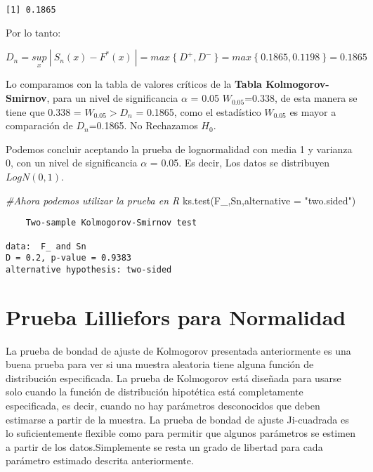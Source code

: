 \documentclass[
  a4paper,
  oneside,
  openany]{book}
\newenvironment{Shaded}{\begin{snugshade}}{\end{snugshade}}
\newcommand{\AttributeTok}[1]{\textcolor[rgb]{0.77,0.63,0.00}{#1}}
\newcommand{\CommentTok}[1]{\textcolor[rgb]{0.56,0.35,0.01}{\textit{#1}}}
\newcommand{\FunctionTok}[1]{\textcolor[rgb]{0.00,0.00,0.00}{#1}}
\newcommand{\NormalTok}[1]{#1}
\newcommand{\StringTok}[1]{\textcolor[rgb]{0.31,0.60,0.02}{#1}}
\begin{document}
\begin{verbatim}
[1] 0.1865
\end{verbatim}

Por lo tanto:

\[D_{n}=\underset{x}{sup} \ | \ S_{n}(x)-F^*(x)\ |=max\ \{\ D^+,D^- \ \}=max \ \{ \ 0.1865,0.1198 \ \}=0.1865\]

Lo comparamos con la tabla de valores críticos de la \textbf{Tabla Kolmogorov-Smirnov}, para un nivel de significancia \(\alpha\) = 0.05
\(W_{0.05}\)=0.338, de esta manera se tiene que 0.338 = \(W_{0.05} > D_{n}\) = 0.1865, como el estadístico \(W_{0.05}\) es mayor a comparación de \(D_{n}\)=0.1865.
No Rechazamos \(H_0\).

Podemos concluir aceptando la prueba de lognormalidad con media 1 y varianza 0, con un nivel de significancia \(\alpha\) = 0.05. Es decir, Los datos se distribuyen \(LogN(0,1)\).

\begin{Shaded}
\begin{Highlighting}[]
\CommentTok{\#Ahora podemos utilizar la prueba en R}
\FunctionTok{ks.test}\NormalTok{(F\_,Sn,}\AttributeTok{alternative =} \StringTok{"two.sided"}\NormalTok{)}
\end{Highlighting}
\end{Shaded}

\begin{verbatim}
    Two-sample Kolmogorov-Smirnov test

data:  F_ and Sn
D = 0.2, p-value = 0.9383
alternative hypothesis: two-sided
\end{verbatim}

\hypertarget{prueba-lilliefors-para-normalidad}{%
\chapter{Prueba Lilliefors para Normalidad}\label{prueba-lilliefors-para-normalidad}}

La prueba de bondad de ajuste de Kolmogorov presentada anteriormente es una buena prueba para ver si una muestra aleatoria tiene alguna función de distribución especificada. La prueba de Kolmogorov está diseñada para usarse solo cuando la función de distribución hipotética está completamente especificada, es decir, cuando no hay parámetros desconocidos que deben estimarse a partir de la muestra.
La prueba de bondad de ajuste Ji-cuadrada es lo suficientemente flexible como para permitir que algunos parámetros se estimen a partir de los datos.Simplemente se resta un grado de libertad para cada parámetro estimado descrita anteriormente.
\end{document}
